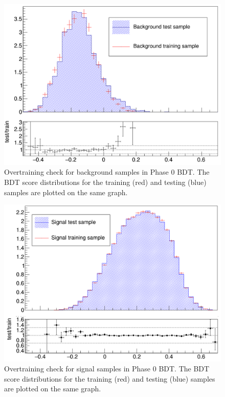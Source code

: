 \begin{figure}[h]
	\centering
	\includegraphics[width=0.9\linewidth]{Figures/Phase0BDT_bkgOTcheck}
	\caption[Overtraining check for background samples in Phase 0 BDT.]{Overtraining check for background samples in Phase 0 BDT.  The BDT score distributions for the training (red) and testing (blue) samples are plotted on the same graph.}
	\label{fig:phase0bdtbkgotcheck}
\end{figure}
\begin{figure}[h]
	\centering
	\includegraphics[width=0.9\linewidth]{Figures/Phase0BDT_signalOTcheck}
	\caption[Overtraining check for signal samples in Phase 0 BDT.]{Overtraining check for signal samples in Phase 0 BDT.  The BDT score distributions for the training (red) and testing (blue) samples are plotted on the same graph.}
	\label{fig:phase0bdtsignalotcheck}
\end{figure}
